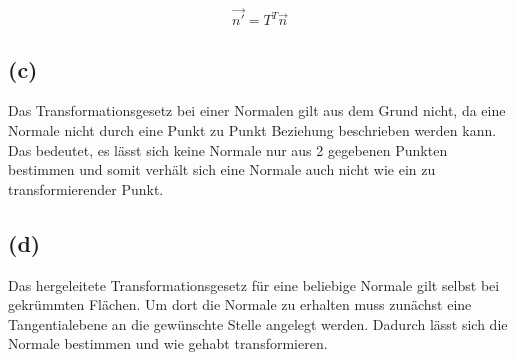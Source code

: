 \documentclass[12pt]{scrreprt}
\begin{document}
\[
	\vec{n'} = T^T \vec{n}
\]

\subsection*{(c)}
Das Transformationsgesetz bei einer Normalen gilt aus dem Grund nicht, da eine Normale nicht durch eine Punkt zu Punkt Beziehung beschrieben werden kann. Das bedeutet, es lässt sich keine Normale nur aus 2 gegebenen Punkten bestimmen und somit verhält sich eine Normale auch nicht wie ein zu transformierender Punkt.
\subsection*{(d)}
Das hergeleitete Transformationsgesetz für eine beliebige Normale gilt selbst bei gekrümmten Flächen. Um dort die Normale zu erhalten muss zunächst eine Tangentialebene an die gewünschte Stelle angelegt werden. Dadurch lässt sich die Normale bestimmen und wie gehabt transformieren.
\end{document}
